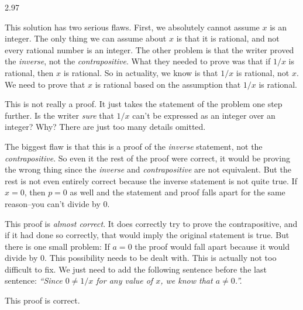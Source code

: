 \begin{Answer}{2.97}
\begin{pfevalenum}
\item
This solution has two serious flaws.  First, we absolutely cannot assume $x$ is an integer.
The only thing we can assume about $x$ is that it is rational, and not every rational number
is an integer.
The other problem is that the writer proved the {\em inverse}, not the {\em contrapositive}.
What they needed to prove was that if $1/x$ is rational, then $x$ is rational.
So in actuality, we know is that $1/x$ is rational, not $x$.  We need to prove that $x$ is
rational based on the assumption that $1/x$ is rational.
\item
This is not really a proof.  It just takes the statement of the problem one step further.
Is the writer {\em sure} that $1/x$ can't be expressed as an integer over an integer?  Why?
There are just too many details omitted.
\item
The biggest flaw is that this is a proof of the {\em inverse} statement, not the {\em contrapositive}.
So even it the rest of the proof were correct, it would be proving the wrong thing
since the {\em inverse} and {\em contrapositive} are not equivalent.  But the rest is not
even entirely correct because the inverse statement is not quite true.
If $x=0$, then $p=0$ as well and the statement and proof falls apart for the same reason--you can't divide by $0$.
\item
This proof is {\em almost correct}.  It does correctly try to prove the contrapositive, and if it had done so
correctly, that would imply the original statement is true.
But there is one small problem:  If $a=0$ the proof
would fall apart because it would divide by $0$.  This possibility needs to be dealt with.
This is actually not too difficult to fix.  We just need to add the following sentence before the last sentence:
{\em ``Since $0\neq 1/x$ for any value of $x$, we know that $a\neq 0$.''.}
\item
This proof is correct.
\end{pfevalenum}
\end{Answer}
